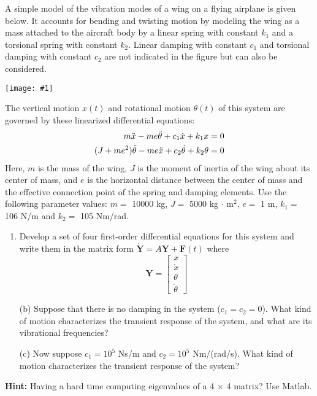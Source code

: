 \documentclass[12pt,letterpaper]{hmcpset}
\newcommand{\diagram}[2]{\begin{center}\texttt{[image: \#1]}\end{center}}
\begin{document}
	
	
	\begin{problem}[1]
		\setlength{\parskip}{3pt}
		A simple model of the vibration modes of a wing on a flying airplane is given below. It
		accounts for bending and twisting motion by modeling the wing as a mass attached to the
		aircraft body by a linear spring with constant $k_1$ and a torsional spring with constant $k_2$.
		Linear damping with constant $c_1$ and torsional damping with constant $c_2$ are not indicated in
		the figure but can also be considered.
		
		\diagram{Airplane}{5}
		
		The vertical motion $x(t)$ and rotational motion $\theta(t)$ of this system are governed by these
		linearized differential equations:
		\begin{displaymath}
		\begin{split}
		m\Ddot{x} - me\Ddot{\theta} + c_1 \Dot{x} + k_1 x &= 0\\
		(J + me^2)\Ddot{\theta} - me\Ddot{x} + c_2 \Dot{\theta} + k_2 \theta &= 0
		\end{split}
		\end{displaymath}
		Here, $m$ is the mass of the wing, $J$ is the moment of inertia of the wing about its center of
		mass, and $e$ is the horizontal distance between the center of mass and the effective connection
		point of the spring and damping elements.
		Use the following parameter values: $m =$ 10000 kg, $J =$ 5000 kg $\cdot$ m$^2$, $e =$ 1 m, $k_1 =$ 106 N/m
		and $k_2 =$ 105 Nm/rad.
		\begin{enumerate}
			\item Develop a set of four first-order differential equations for this system and write them in
			the matrix form $\Dot{\textbf{Y}} = A\textbf{Y} + \textbf{F}(t)$ where
			$$ \textbf{Y} = \begin{bmatrix}
				x\\
				\Dot{x}\\
				\theta\\
				\Dot{\theta}
				\end{bmatrix}
			$$
		\end{enumerate}
	\end{problem}
	
	\newpage
	
	\begin{problem}[1 (cont.)]
		\begin{enumerate}
		\item[(b)]  Suppose that there is no damping in the system ($c_1 = c_2 = 0$). What kind of motion
		characterizes the transient response of the system, and what are its vibrational frequencies?
		
		\item[(c)] Now suppose $c_1 = 10^5$ Ns/m and $c_2 = 10^5$ Nm/(rad/s). What kind of motion characterizes
		the transient response of the system?
		\end{enumerate}
	\textbf{Hint:} Having a hard time computing eigenvalues of a 4 × 4 matrix? Use Matlab.

	\end{problem}
	
\end{document}
